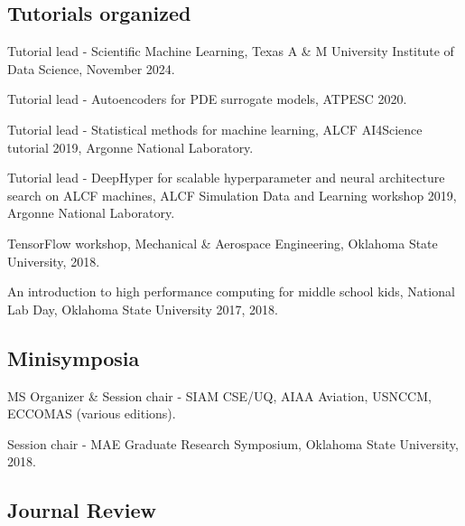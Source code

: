\documentclass[letterpaper]{article}
\renewenvironment{itemize}{
  \begin{list}{}{
    \setlength{\leftmargin}{1.5em}
  }
}{
  \end{list}
}
\begin{document}
\subsection*{Tutorials organized}

\begin{itemize}
  \item Tutorial lead - Scientific Machine Learning, Texas A \& M University Institute of Data Science, November 2024.
  \item Tutorial lead - Autoencoders for PDE surrogate models, ATPESC 2020.
  \item Tutorial lead - Statistical methods for machine learning, ALCF AI4Science tutorial 2019, Argonne National Laboratory.
  \item Tutorial lead - DeepHyper for scalable hyperparameter and neural architecture search on ALCF machines, ALCF Simulation Data and Learning workshop 2019, Argonne National Laboratory.
  \item TensorFlow workshop, Mechanical \& Aerospace Engineering, Oklahoma State University, 2018.
  \item An introduction to high performance computing for middle school kids, National Lab Day, Oklahoma State University 2017, 2018.
\end{itemize}

\subsection*{Minisymposia}

\begin{itemize}
  \item MS Organizer \& Session chair - SIAM CSE/UQ, AIAA Aviation, USNCCM, ECCOMAS (various editions).
  \item Session chair - MAE Graduate Research Symposium, Oklahoma State University, 2018.
\end{itemize}

\subsection*{Journal Review}
\end{document}
